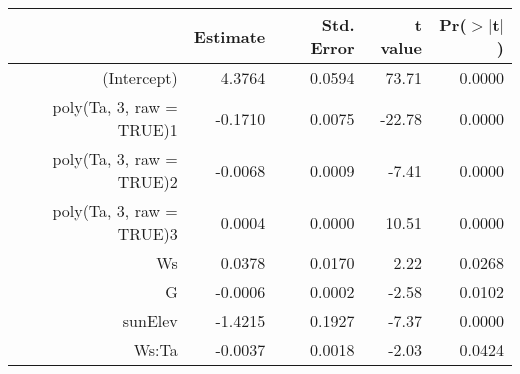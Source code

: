 \begin{tabular}{rrrrr}
  \hline
 & Estimate & Std. Error & t value & Pr($>$$|$t$|$) \\ 
  \hline
(Intercept) & 4.3764 & 0.0594 & 73.71 & 0.0000 \\ 
  poly(Ta, 3, raw = TRUE)1 & -0.1710 & 0.0075 & -22.78 & 0.0000 \\ 
  poly(Ta, 3, raw = TRUE)2 & -0.0068 & 0.0009 & -7.41 & 0.0000 \\ 
  poly(Ta, 3, raw = TRUE)3 & 0.0004 & 0.0000 & 10.51 & 0.0000 \\ 
  Ws & 0.0378 & 0.0170 & 2.22 & 0.0268 \\ 
  G & -0.0006 & 0.0002 & -2.58 & 0.0102 \\ 
  sunElev & -1.4215 & 0.1927 & -7.37 & 0.0000 \\ 
  Ws:Ta & -0.0037 & 0.0018 & -2.03 & 0.0424 \\ 
   \hline
\end{tabular}
